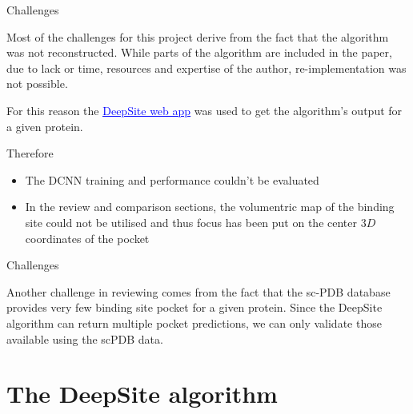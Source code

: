 \documentclass{beamer}
\newcommand{\link}[2]{\href{#1}{\textcolor{blue}{\underline{#2}}}}
\begin{document}
\begin{frame}{Challenges}
  \begin{block}{}
    Most of the challenges for this project derive from the fact that the algorithm was not reconstructed.
    While parts of the algorithm are included in the paper, due to lack or time, resources and expertise of the author, re-implementation was not possible.

    For this reason the \link{https://www.playmolecule.com/deepsite/}{DeepSite web app} was used to get the algorithm's output for a given protein.
  \end{block}
  \begin{block}{}
    Therefore
    \begin{itemize}
      \item The DCNN training and performance couldn't be evaluated
      \item In the review and comparison sections, the volumentric map of the binding site could not be utilised and thus focus has been put on the center $3D$ coordinates of the pocket
    \end{itemize}
  \end{block}
\end{frame}

\begin{frame}{Challenges}
  \begin{block}{}
    Another challenge in reviewing comes from the fact that the sc-PDB database provides very few binding site pocket for a given protein. Since the DeepSite algorithm can return multiple pocket predictions, we can only validate those available using the scPDB data.
  \end{block}
\end{frame}

\section{The DeepSite algorithm}
\end{document}
